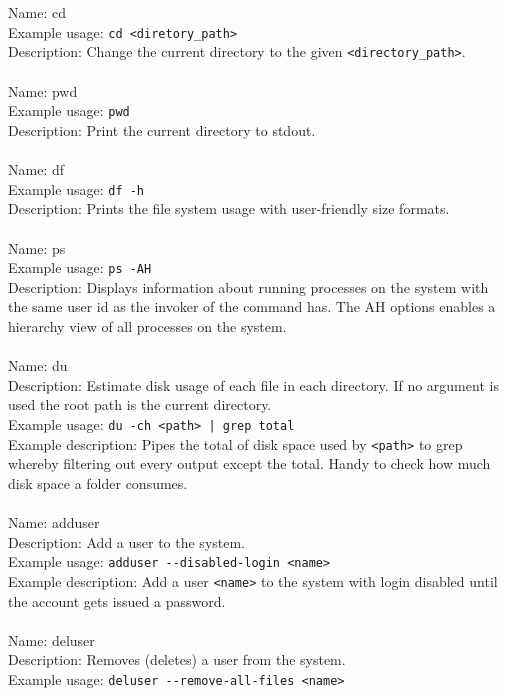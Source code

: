 \documentclass[a4paper,10pt]{article}
\begin{document}
\\
\\
Name: cd
\\
Example usage: \verb!cd <diretory_path>!
\\
Description: Change the current directory to the given \verb!<directory_path>!.
\\
\\
Name: pwd
\\
Example usage: \verb!pwd!
\\
Description: Print the current directory to stdout.
\\
\\
Name: df
\\
Example usage: \verb!df -h!
\\
Description: Prints the file system usage with user-friendly size formats.
\\
\\
Name: ps
\\
Example usage: \verb!ps -AH!
\\
Description: Displays information about running processes on the system with the same user id as the invoker of the command has. The AH options enables a hierarchy view of all processes on the system.
\\
\\
Name: du
\\
Description: Estimate disk usage of each file in each directory. If no argument is used the root path is the current directory.
\\
Example usage: \verb!du -ch <path> | grep total!
\\
Example description: Pipes the total of disk space used by \verb!<path>! to grep whereby filtering out every output except the total. Handy to check how much disk space a folder consumes.
\\
\\
Name: adduser 
\\
Description: Add a user to the system.
\\
Example usage: \verb!adduser --disabled-login <name>!
\\
Example description: Add a user \verb!<name>! to the system with login disabled until the account gets issued a password.
\\
\\
Name: deluser 
\\
Description: Removes (deletes) a user from the system.
\\
Example usage: \verb!deluser --remove-all-files <name>!
\\
\end{document}
